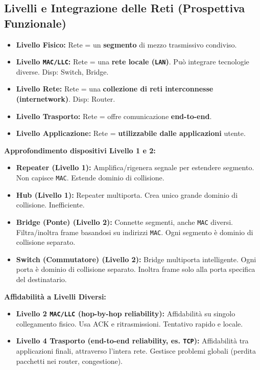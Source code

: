 \subsection{Livelli e Integrazione delle Reti (Prospettiva Funzionale)}
\begin{itemize}
    \item \textbf{Livello Fisico:} Rete = un \textbf{segmento} di mezzo trasmissivo condiviso.
    \item \textbf{Livello \texttt{MAC/LLC}:} Rete = una \textbf{rete locale (\texttt{LAN})}. Può integrare tecnologie diverse. Disp: Switch, Bridge.
    \item \textbf{Livello Rete:} Rete = una \textbf{collezione di reti interconnesse (internetwork)}. Disp: Router.
    \item \textbf{Livello Trasporto:} Rete = offre comunicazione \textbf{end-to-end}.
    \item \textbf{Livello Applicazione:} Rete = \textbf{utilizzabile dalle applicazioni} utente.
\end{itemize}

\textbf{Approfondimento dispositivi Livello 1 e 2:}
\begin{itemize}
    \item \textbf{Repeater (Livello 1):} Amplifica/rigenera segnale per estendere segmento. Non capisce \texttt{MAC}. Estende dominio di collisione.
    \item \textbf{Hub (Livello 1):} Repeater multiporta. Crea unico grande dominio di collisione. Inefficiente.
    \item \textbf{Bridge (Ponte) (Livello 2):} Connette segmenti, anche \texttt{MAC} diversi. Filtra/inoltra frame basandosi su indirizzi \texttt{MAC}. Ogni segmento è dominio di collisione separato.
    \item \textbf{Switch (Commutatore) (Livello 2):} Bridge multiporta intelligente. Ogni porta è dominio di collisione separato. Inoltra frame solo alla porta specifica del destinatario.
\end{itemize}

\textbf{Affidabilità a Livelli Diversi:}
\begin{itemize}
    \item \textbf{Livello 2 \texttt{MAC/LLC} (hop-by-hop reliability):} Affidabilità su singolo collegamento fisico. Usa ACK e ritrasmissioni. Tentativo rapido e locale.
    \item \textbf{Livello 4 Trasporto (end-to-end reliability, es. \texttt{TCP}):} Affidabilità tra applicazioni finali, attraverso l'intera rete. Gestisce problemi globali (perdita pacchetti nei router, congestione).
\end{itemize}

